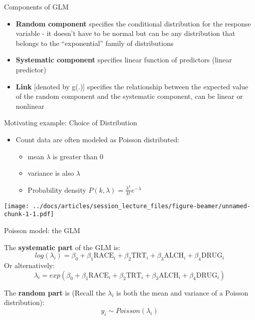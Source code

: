 \documentclass[
  ignorenonframetext,
]{beamer}
\providecommand{\tightlist}{%
  \setlength{\itemsep}{0pt}\setlength{\parskip}{0pt}}
\begin{document}
\begin{frame}{Components of GLM}
\protect\hypertarget{components-of-glm}{}

\begin{itemize}
\tightlist
\item
  \textbf{Random component} specifies the conditional distribution for
  the response variable - it doesn't have to be normal but can be any
  distribution that belongs to the ``exponential'' family of
  distributions
\item
  \textbf{Systematic component} specifies linear function of predictors
  (linear predictor)
\item
  \textbf{Link} {[}denoted by g(.){]} specifies the relationship between
  the expected value of the random component and the systematic
  component, can be linear or nonlinear
\end{itemize}

\end{frame}

\begin{frame}{Motivating example: Choice of Distribution}
\protect\hypertarget{motivating-example-choice-of-distribution}{}

\begin{itemize}
\tightlist
\item
  Count data are often modeled as Poisson distributed:

  \begin{itemize}
  \tightlist
  \item
    mean \(\lambda\) is greater than 0
  \item
    variance is also \(\lambda\)
  \item
    Probability density
    \(P(k, \lambda) = \frac{\lambda^k}{k!} e^{-\lambda}\)
  \end{itemize}
\end{itemize}

\texttt{[image: ../docs/articles/session\_lecture\_files/figure-beamer/unnamed-chunk-1-1.pdf]}

\end{frame}

\begin{frame}{Poisson model: the GLM}
\protect\hypertarget{poisson-model-the-glm}{}

The \textbf{systematic part} of the GLM is: \[
log(\lambda_i) = \beta_0 + \beta_1 \textrm{RACE}_i + \beta_2 \textrm{TRT}_i + \beta_3 \textrm{ALCH}_i + \beta_4 \textrm{DRUG}_i
\] Or alternatively: \[
\lambda_i = exp \left( \beta_0 + \beta_1 \textrm{RACE}_i + \beta_2 \textrm{TRT}_i + \beta_3 \textrm{ALCH}_i + \beta_4 \textrm{DRUG}_i \right)
\]

The \textbf{random part} is (Recall the \(\lambda_i\) is both the mean
and variance of a Poisson distribution): \[
y_i \sim Poisson(\lambda_i)
\]

\end{frame}
\end{document}
